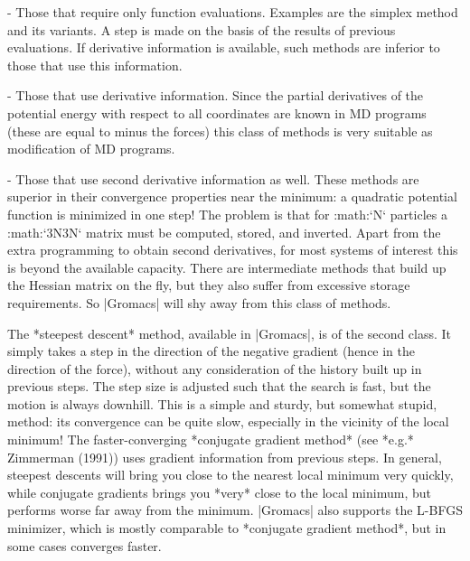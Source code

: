 -  Those that require only function evaluations. Examples are the
   simplex method and its variants. A step is made on the basis of the
   results of previous evaluations. If derivative information is
   available, such methods are inferior to those that use this
   information.

-  Those that use derivative information. Since the partial derivatives
   of the potential energy with respect to all coordinates are known in
   MD programs (these are equal to minus the forces) this class of
   methods is very suitable as modification of MD programs.

-  Those that use second derivative information as well. These methods
   are superior in their convergence properties near the minimum: a
   quadratic potential function is minimized in one step! The problem is
   that for :math:`N` particles a :math:`3N\times 3N` matrix must be
   computed, stored, and inverted. Apart from the extra programming to
   obtain second derivatives, for most systems of interest this is
   beyond the available capacity. There are intermediate methods that
   build up the Hessian matrix on the fly, but they also suffer from
   excessive storage requirements. So |Gromacs| will shy away from this
   class of methods.

The *steepest descent* method, available in |Gromacs|, is of the second
class. It simply takes a step in the direction of the negative gradient
(hence in the direction of the force), without any consideration of the
history built up in previous steps. The step size is adjusted such that
the search is fast, but the motion is always downhill. This is a simple
and sturdy, but somewhat stupid, method: its convergence can be quite
slow, especially in the vicinity of the local minimum! The
faster-converging *conjugate gradient method* (see *e.g.* Zimmerman
(1991)) uses gradient information from previous steps. In general,
steepest descents will bring you close to the nearest local minimum very
quickly, while conjugate gradients brings you *very* close to the local
minimum, but performs worse far away from the minimum. |Gromacs| also
supports the L-BFGS minimizer, which is mostly comparable to *conjugate
gradient method*, but in some cases converges faster.
